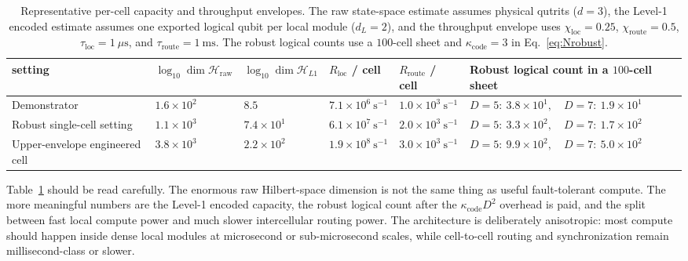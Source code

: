 \documentclass[11pt]{report}
\theoremstyle{definition}
\begin{document}
\begin{table}[ht]
\centering
\scriptsize
\caption{Representative per-cell capacity and throughput envelopes. The raw state-space estimate assumes physical qutrits ($d=3$), the Level-1 encoded estimate assumes one exported logical qubit per local module ($d_L=2$), and the throughput envelope uses $\chi_{\mathrm{loc}}=0.25$, $\chi_{\mathrm{route}}=0.5$, $\tau_{\mathrm{loc}}=1~\mu\mathrm{s}$, and $\tau_{\mathrm{route}}=1~\mathrm{ms}$. The robust logical counts use a $100$-cell sheet and $\kappa_{\mathrm{code}}=3$ in Eq.~\eqref{eq:Nrobust}.}
\begin{tabularx}{\textwidth}{>{\raggedright\arraybackslash}p{2.2cm} >{\centering\arraybackslash}p{1.6cm} >{\centering\arraybackslash}p{1.6cm} >{\centering\arraybackslash}p{1.8cm} >{\centering\arraybackslash}p{1.8cm} X}
\toprule
setting & $\log_{10}\dim\mathcal{H}_{\mathrm{raw}}$ & $\log_{10}\dim\mathcal{H}_{L1}$ & $R_{\mathrm{loc}}$ / cell & $R_{\mathrm{route}}$ / cell & Robust logical count in a $100$-cell sheet \\
\midrule
Demonstrator & $1.6\times10^2$ & $8.5$ & $7.1\times10^6~\mathrm{s}^{-1}$ & $1.0\times10^3~\mathrm{s}^{-1}$ & $D=5:\ 3.8\times10^1,\quad D=7:\ 1.9\times10^1$ \\
Robust single-cell setting & $1.1\times10^3$ & $7.4\times10^1$ & $6.1\times10^7~\mathrm{s}^{-1}$ & $2.0\times10^3~\mathrm{s}^{-1}$ & $D=5:\ 3.3\times10^2,\quad D=7:\ 1.7\times10^2$ \\
Upper-envelope engineered cell & $3.8\times10^3$ & $2.2\times10^2$ & $1.9\times10^8~\mathrm{s}^{-1}$ & $3.0\times10^3~\mathrm{s}^{-1}$ & $D=5:\ 9.9\times10^2,\quad D=7:\ 5.0\times10^2$ \\
\bottomrule
\end{tabularx}
\label{tab:capacity-envelope}
\end{table}

Table~\ref{tab:capacity-envelope} should be read carefully. The enormous raw Hilbert-space dimension is not the same thing as useful fault-tolerant compute. The more meaningful numbers are the Level-1 encoded capacity, the robust logical count after the $\kappa_{\mathrm{code}}D^2$ overhead is paid, and the split between fast local compute power and much slower intercellular routing power. The architecture is deliberately anisotropic: most compute should happen inside dense local modules at microsecond or sub-microsecond scales, while cell-to-cell routing and synchronization remain millisecond-class or slower.
\end{document}
